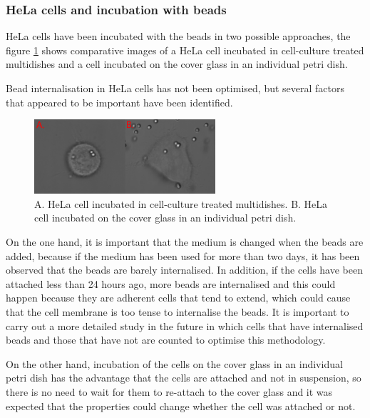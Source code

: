 \documentclass[12pt, a4paper]{article} %
\begin{document}
	\setlength{\parskip}{0mm}
	
	\subsubsection{HeLa cells and incubation with beads}
	
	HeLa cells have been incubated with the beads in two possible approaches, the figure \ref{fig:hela_cell_shape} shows comparative images of a HeLa cell incubated in cell-culture treated multidishes and a cell incubated on the cover glass in an individual petri dish.
	
	\setlength{\parskip}{4mm}
	
	Bead internalisation in HeLa cells has not been optimised, but several factors that appeared to be important have been identified.
	\newpage
	\begin{figure}[htbp]
		\centering
		\includegraphics[width=0.60\textwidth]{figures/hela_cell_shape.png}
		\caption{A. HeLa cell incubated in cell-culture treated multidishes. B. HeLa cell incubated on the cover glass in an individual petri dish.}
		\label{fig:hela_cell_shape} 
	\end{figure}
	On the one hand, it is important that the medium is changed when the beads are added, because if the medium has been used for more than two days, it has been observed that the beads are barely internalised. In addition, if the cells have been attached less than 24 hours ago, more beads are internalised and this could happen because they are adherent cells that tend to extend, which could cause that the cell membrane is too tense to internalise the beads. It is important to carry out a more detailed study in the future in which cells that have internalised beads and those that have not are counted to optimise this methodology.
	
	On the other hand, incubation of the cells on the cover glass in an individual petri dish has the advantage that the cells are attached and not in suspension, so there is no need to wait for them to re-attach to the cover glass and it was expected that the properties could change whether the cell was attached or not.
	
\end{document}
